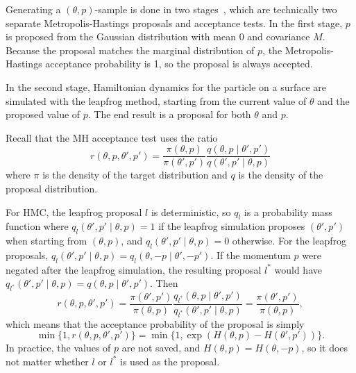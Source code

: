 \documentclass[english,twoside,openright]{HYgraduMLDS}
\begin{document}
Generating a \((\theta, p)\)-sample is done in two stages~\cite{neal2012mcmc}, 
which are technically 
two separate Metropolis-Hastings proposals and acceptance tests. In the first 
stage, \(p\) is proposed from the Gaussian distribution with mean 0 and 
covariance \(M\). Because the proposal matches the marginal distribution of 
\(p\), the Metropolis-Hastings acceptance probability is 1, so the proposal
is always accepted.

In the second stage, Hamiltonian dynamics for the particle on a surface are 
simulated with the leapfrog method, starting from the current value 
of \(\theta\) and the proposed value of \(p\). The end result is a proposal 
for both \(\theta\) and \(p\).

Recall that the MH acceptance test uses the ratio
\[
  r(\theta, p, \theta', p') = \frac{\pi(\theta, p)}{\pi(\theta', p')}
  \frac{q(\theta, p\mid \theta', p')}{q(\theta', p'\mid \theta, p)}
\]
where \(\pi\) is the density of the target distribution and \(q\) is
the density of the proposal distribution.

For HMC, the leapfrog proposal \(l\)
is deterministic, so \(q_{l}\) is a probability mass function where
\(q_{l}(\theta', p'\mid \theta, p) = 1\) if the leapfrog simulation
proposes \((\theta', p')\) when starting from \((\theta, p)\),
and \(q_{l}(\theta', p'\mid \theta, p) = 0\) otherwise. For the leapfrog proposals,
\(q_{l}(\theta', p'\mid \theta, p) = q_{l}(\theta, -p\mid \theta', -p')\).
If the momentum \(p\) were negated after the leapfrog simulation, the
resulting proposal \(l^{*}\) would have
\(q_{l^{*}}(\theta', p'\mid \theta, p) = q(\theta, p\mid \theta', p')\).
Then
\[
  r(\theta, p, \theta', p')
  = \frac{\pi(\theta', p')}{\pi(\theta, p)}
  \frac{q_{l^{*}}(\theta, p\mid \theta', p')}{q_{l^{*}}(\theta', p'\mid \theta, p)}
  = \frac{\pi(\theta', p')}{\pi(\theta, p)},
\]
which means that the acceptance probability of the proposal is simply
\[
  \min\{1, r(\theta, p, \theta', p')\}
  = \min\{1, \exp(H(\theta, p) - H(\theta', p'))\}.
\]
In practice, the values of \(p\) are not saved, and
\(H(\theta, p) = H(\theta, -p)\), so it does not matter whether
\(l\) or \(l^{*}\) is used as the proposal.

\end{document}
